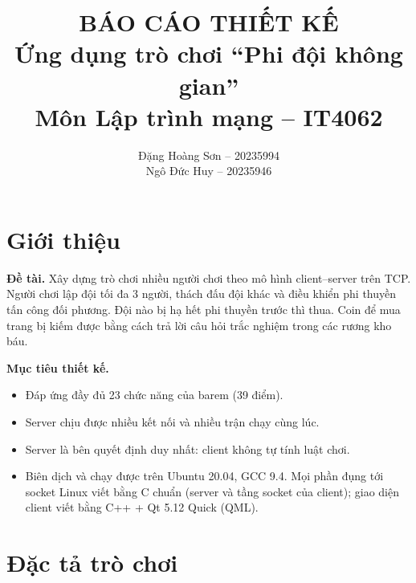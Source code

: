 \documentclass[12pt,a4paper]{article}
\title{\textbf{BÁO CÁO THIẾT KẾ}\\[4pt]
       \large Ứng dụng trò chơi ``Phi đội không gian''\\[2pt]
       \normalsize Môn Lập trình mạng -- IT4062}
\author{Đặng Hoàng Sơn -- 20235994\\ Ngô Đức Huy -- 20235946}
\newcommand{\cmd}[1]{\texttt{\seqsplit{#1}}}
\begin{document}
\maketitle
\tableofcontents
\newpage

\section{Giới thiệu}

\textbf{Đề tài.} Xây dựng trò chơi nhiều người chơi theo mô hình client--server trên TCP. Người chơi lập đội tối đa 3 người, thách đấu đội khác và điều khiển phi thuyền tấn công đối phương. Đội nào bị hạ hết phi thuyền trước thì thua. Coin để mua trang bị kiếm được bằng cách trả lời câu hỏi trắc nghiệm trong các rương kho báu.

\textbf{Mục tiêu thiết kế.}
\begin{itemize}
  \item Đáp ứng đầy đủ 23 chức năng của barem (39 điểm).
  \item Server chịu được nhiều kết nối và nhiều trận chạy cùng lúc.
  \item Server là bên quyết định duy nhất: client không tự tính luật chơi.
  \item Biên dịch và chạy được trên Ubuntu 20.04, GCC 9.4. Mọi phần đụng tới socket Linux viết bằng C chuẩn \cmd{-std=c11} (server và tầng socket của client); giao diện client viết bằng C++ + Qt 5.12 Quick (QML).
\end{itemize}

\section{Đặc tả trò chơi}
\end{document}
